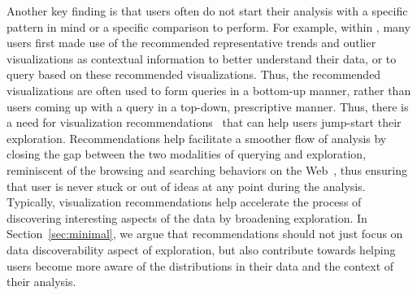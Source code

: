 Another key finding is that 
users often do not start their analysis 
with a specific pattern in mind or a specific comparison to perform. 
For example, within \zv, many users 
first made use of the recommended 
representative trends and outlier visualizations 
as contextual information 
to better understand their data, 
or to query based on these recommended visualizations.
Thus, the recommended visualizations
are often used to form queries in a bottom-up
manner, rather than users coming up with a query
in a top-down, prescriptive manner.
Thus, there is a need for visualization recommendations~\cite{Vartak2017}
that can help users jump-start their exploration.
Recommendations help facilitate a smoother flow
of analysis by closing the gap between the two modalities
of querying and exploration, 
reminiscent of the browsing and searching 
behaviors on the Web~\cite{Olston2003}, thus 
ensuring that user is never stuck or out of 
ideas at any point during the analysis. 
Typically, visualization recommendations help 
accelerate the process of discovering 
interesting aspects of the data by broadening exploration. 
In Section~\ref{sec:minimal}, we argue 
that recommendations should not just focus on 
data discoverability aspect of exploration, but also contribute towards helping users become more aware of the distributions in their data and the context of their analysis.
